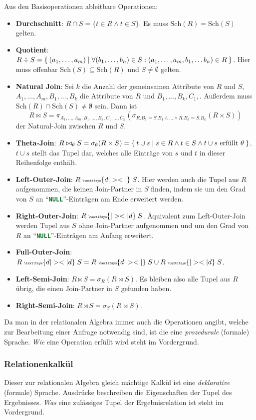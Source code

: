 \documentclass[a4paper,parskip=half*,DIV=15,fontsize=11pt]{scrartcl}
\newcommand{\Sch}{\mathrm{Sch}} %
\newcommand{\sql}[1]{\lstinline[language=sql, mathescape=true]{#1}}
\newcommand{\lojoin}{\;{\tiny \textifsym{d|><|}}\;}
\newcommand{\rojoin}{\;{\tiny \textifsym{|><|d}}\;}
\newcommand{\ojoin}{\;{\tiny \textifsym{d|><|d}}\;}
\begin{document}
Aus den Basisoperationen ableitbare Operationen:
\begin{itemize}
\item \textbf{Durchschnitt}: $R \cap S = \{t \in R \land t \in S\}$. Es muss $\Sch(R) = \Sch(S)$ gelten.
\item \textbf{Quotient}: $R \div S = \Set{(a_1, \ldots, a_m)| \forall(b_1, \ldots, b_n) \in S: (a_1, \ldots, a_m, b_1, \ldots b_n) \in R}$. Hier muss offenbar $\Sch(S) \subseteq \Sch(R)$ und $S \neq \emptyset$ gelten.
\item \textbf{Natural Join}: Sei $k$ die Anzahl der gemeinsamen Attribute von $R$ und $S$, $A_1, \ldots, A_m, B_1, \ldots, B_k$ die Attribute von $R$ und $B_1, \ldots, B_k, C_1, $. Außerdem muss $\Sch(R) \cap \Sch(S) \neq \emptyset$ sein. Dann ist $$R \bowtie S = \pi_{A_1, \ldots, A_m,B_1,\ldots,B_k,C_1,\ldots,C_n} (\sigma_{R.B_1 = S.B_1 \land \ldots \land R.B_k = S.B_k}(R \times S))$$ der Natural-Join zwischen $R$ und $S$.
\item \textbf{Theta-Join}: $R \bowtie_\theta S = \sigma_\theta(R \times S) = \Set{t \cup s | s \in R \land t \in S \land t \cup s \text{ erfüllt } \theta}$. $t \cup s$ stellt das Tupel dar, welches alle Einträge von $s$ und $t$ in dieser Reihenfolge enthält.
\item \textbf{Left-Outer-Join}: $R \lojoin S$. Hier werden auch die Tupel aus $R$ aufgenommen, die keinen Join-Partner in $S$ finden, indem sie um den Grad von $S$ an ``\sql{NULL}''-Einträgen am Ende erweitert werden.
\item \textbf{Right-Outer-Join}: $R \rojoin S$. Äquivalent zum Left-Outer-Join werden Tupel aus $S$ ohne Join-Partner aufgenommen und um den Grad von $R$ an ``\sql{NULL}''-Einträgen am Anfang erweitert.
\item \textbf{Full-Outer-Join}: $R \ojoin S = R \lojoin S \cup R \rojoin S$.
\item \textbf{Left-Semi-Join}: $R \ltimes S = \sigma_R(R \bowtie S)$. Es bleiben also alle Tupel aus $R$ übrig, die einen Join-Partner in $S$ gefunden haben.
\item \textbf{Right-Semi-Join}: $R \rtimes S = \sigma_S(R \bowtie S)$.
\end{itemize}

Da man in der relationalen Algebra immer auch die Operationen angibt, welche zur Bearbeitung einer Anfrage notwendig sind, ist die eine \textit{prozedurale} (formale) Sprache. \emph{Wie} eine Operation erfüllt wird steht im Vordergrund.

\subsubsection{Relationenkalkül}
Dieser zur relationalen Algebra gleich mächtige Kalkül ist eine \textit{deklarative} (formale) Sprache. Ausdrücke beschreiben die Eigenschaften der Tupel des Ergebnisses. \emph{Was} eine zulässiges Tupel der Ergebnisrelation ist steht im Vordergrund.
\end{document}
